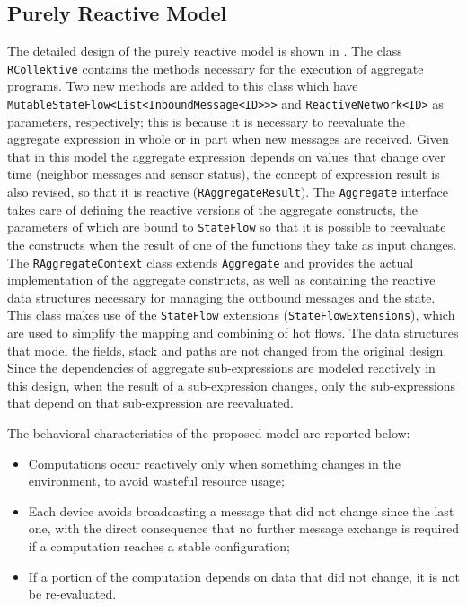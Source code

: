 \subsection{Purely Reactive Model}
\label{subsection:purely-reactive-model}

The detailed design of the purely reactive model is shown in . The class \texttt{RCollektive} contains the methods necessary for the execution of aggregate programs. Two new methods are added to this class which have \texttt{MutableStateFlow<List<InboundMessage<ID>>>} and \texttt{ReactiveNetwork<ID>} as parameters, respectively; this is because it is necessary to reevaluate the aggregate expression in whole or in part when new messages are received. Given that in this model the aggregate expression depends on values that change over time (neighbor messages and sensor status), the concept of expression result is also revised, so that it is reactive (\texttt{RAggregateResult}). The \texttt{Aggregate} interface takes care of defining the reactive versions of the aggregate constructs, the parameters of which are bound to \texttt{StateFlow} so that it is possible to reevaluate the constructs when the result of one of the functions they take as input changes. The \texttt{RAggregateContext} class extends \texttt{Aggregate} and provides the actual implementation of the aggregate constructs, as well as containing the reactive data structures necessary for managing the outbound messages and the state. This class makes use of the \texttt{StateFlow} extensions (\texttt{StateFlowExtensions}), which are used to simplify the mapping and combining of hot flows. The data structures that model the fields, stack and paths are not changed from the original design. Since the dependencies of aggregate sub-expressions are modeled reactively in this design, when the result of a sub-expression changes, only the sub-expressions that depend on that sub-expression are reevaluated.

The behavioral characteristics of the proposed model are reported below:

\begin{itemize}
    \item Computations occur reactively only when something changes in the environment, to avoid wasteful resource usage;
    \item Each device avoids broadcasting a message that did not change since the last one, with the direct consequence that no further message exchange is required if a computation reaches a stable configuration;
    \item If a portion of the computation depends on data that did not change, it is not be re-evaluated.
\end{itemize}

